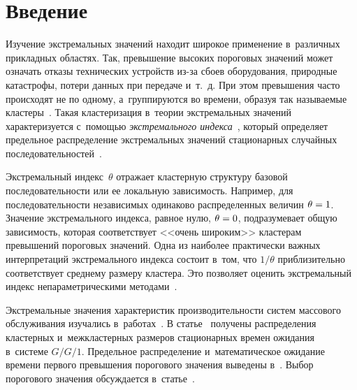 
\thispagestyle{headings}

\begin{multicols}{2}

\label{st\stat}


\section{Введение}

\vspace*{-9pt}

Изучение экстремальных значений находит широкое применение в~различных 
прикладных областях.  Так, превышение высоких пороговых значений может означать 
отказы технических устройств из-за сбоев оборудования, природные катастрофы,\linebreak 
потери данных при передаче и~т.~д. При этом превышения  часто происходят не по 
одному, а~груп\-пируются во времени, образуя так называемые кластеры~\cite{Bertail}.  
Такая кластеризация в~тео\-рии экстремальных значений 
характеризуется с~по\-мощью \textit{экстремального индекса}~\cite{Resnick}, который 
определяет предельное распределение экстремальных значений стационарных 
случайных последовательностей~\cite{embrehts,haan,Leadbetter}.

Экстремальный индекс~$\theta$ отражает кластерную структуру базовой 
последовательности или ее локальную зависимость. Например, для 
последовательности независимых одинаково распределенных величин  $\theta\hm=1$. 
Значение экстремального индекса, равное нулю, $ \theta\hm = 0$, подразумевает общую 
зависимость, которая соответствует <<очень широким>> кластерам превышений 
пороговых значений. Одна из наиболее практически важных интерпретаций 
экстремального индекса состоит в~том, что  $1/\theta $ приблизительно 
соответствует среднему размеру кластера. Это позволяет оценить экстремальный 
индекс непараметрическими методами~\cite{Resnick,novak,weissman94}.

Экстремальные значения характеристик производительности систем массового 
обслуживания изучались в~работах~\cite{Asmus,asmus2,iglehart, Rootzen,Hooghiemstra}. В статье~\cite{razumchik} получены распределения 
кластерных и~межкластерных размеров стационарных времен ожидания в~системе 
$G/G/1$. Предельное распределение и~математическое ожидание времени первого 
превышения порогового значения выведены  в~\cite{markovich}. Выбор порогового 
значения обсуждается в~статье~\cite{rodionov}.



\end{multicols}
